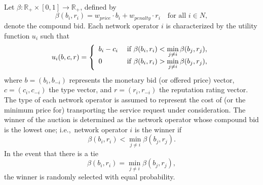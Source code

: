 Let $\beta : \mathbb{R}_+\times [0,1] \to \mathbb{R}_+$, defined by
\begin{equation}
	\label{eq:def_beta_direct}
	\beta(b_i, r_i) = w_{price}\cdot b_i + w_{penalty}\cdot r_i \quad\text{for all } i\in N,
\end{equation}
denote the compound bid. Each network operator $i$ is characterized by the utility function $u_i$ such that
\begin{equation}
	\label{eq:sellers_utility_direct}
	u_i(b,c,r) = \left\{
	\begin{array}{l l}
		b_i-c_i & \;\text{if } \beta(b_i, r_i) < \displaystyle\min_{j\neq i}\beta(b_j,r_j),\\
		0 & \;\text{if } \beta(b_i, r_i) > \displaystyle\min_{j\neq i}\beta(b_j,r_j),
	\end{array}\right.
\end{equation}
where $b = (b_i,b_{-i})$ represents the monetary bid (or offered price) vector, $c = (c_i, c_{-i})$ the type vector, and $r = (r_i, r_{-i})$ the reputation rating vector. The type of each network operator is assumed to represent the cost of (or the minimum price for) transporting the service request under consideration. The winner of the auction is determined as the network operator whose compound bid is the lowest one; i.e.,~network operator $i$ is the winner if
\begin{equation*}
	\beta(b_i, r_i) < \displaystyle\min_{j\neq i}\beta(b_j,r_j).
\end{equation*}
In the event that there is a tie
\begin{equation*}
	\beta(b_i, r_i) = \displaystyle\min_{j\neq i}\beta(b_j,r_j),
\end{equation*}
the winner is randomly selected with equal probability.


